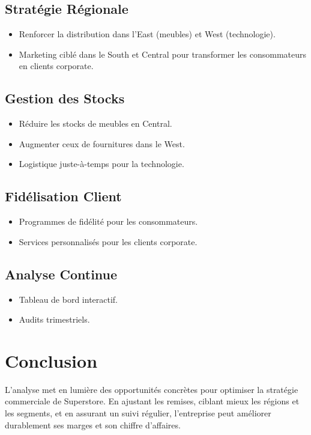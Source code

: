 \documentclass[
]{article}
\providecommand{\tightlist}{%
  \setlength{\itemsep}{0pt}\setlength{\parskip}{0pt}}
\begin{document}
\subsection{Stratégie Régionale}\label{stratuxe9gie-ruxe9gionale}

\begin{itemize}
\tightlist
\item
  Renforcer la distribution dans l'East (meubles) et West (technologie).
\item
  Marketing ciblé dans le South et Central pour transformer les
  consommateurs en clients corporate.
\end{itemize}

\subsection{Gestion des Stocks}\label{gestion-des-stocks}

\begin{itemize}
\tightlist
\item
  Réduire les stocks de meubles en Central.
\item
  Augmenter ceux de fournitures dans le West.
\item
  Logistique juste-à-temps pour la technologie.
\end{itemize}

\subsection{Fidélisation Client}\label{fiduxe9lisation-client}

\begin{itemize}
\tightlist
\item
  Programmes de fidélité pour les consommateurs.
\item
  Services personnalisés pour les clients corporate.
\end{itemize}

\subsection{Analyse Continue}\label{analyse-continue}

\begin{itemize}
\tightlist
\item
  Tableau de bord interactif.
\item
  Audits trimestriels.
\end{itemize}

\section{Conclusion}\label{conclusion}

L'analyse met en lumière des opportunités concrètes pour optimiser la
stratégie commerciale de Superstore. En ajustant les remises, ciblant
mieux les régions et les segments, et en assurant un suivi régulier,
l'entreprise peut améliorer durablement ses marges et son chiffre
d'affaires.
\end{document}
